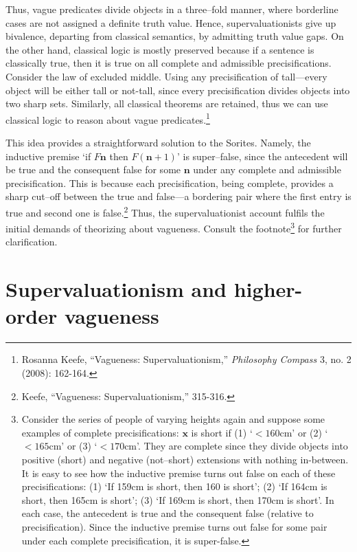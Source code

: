 Thus, vague predicates divide objects in a three--fold manner, where
borderline cases are not assigned a definite truth value. Hence,
supervaluationists give up bivalence, departing from classical
semantics, by admitting truth value gaps. On the other hand, classical
logic is mostly preserved because if a sentence is classically true,
then it is true on all complete and admissible precisifications.
Consider the law of excluded middle. Using any precisification of tall---every object will be either tall or not-tall, since every
precisification divides objects into two sharp sets. Similarly, all
classical theorems are retained, thus we can use classical logic to
reason about vague predicates.\footnote{Rosanna Keefe, ``Vagueness:
  Supervaluationism,'' \emph{Philosophy Compass} 3, no. 2 (2008):
  162-164.}

This idea provides a straightforward solution to the Sorites. Namely,
the inductive premise `if $F\mathbf{n}$ then $F(\mathbf{n}+1)$' is
super--false, since the antecedent will be true and the consequent false
for some $\mathbf{n}$ under any complete and admissible precisification.
This is because each precisification, being complete, provides a sharp
cut--off between the true and false---a bordering pair where the first
entry is true and second one is false.\footnote{Keefe, ``Vagueness:
  Supervaluationism,'' 315-316.} Thus, the supervaluationist account
fulfils the initial demands of theorizing about vagueness. Consult the
footnote\footnote{Consider the series of people of varying heights again
  and suppose some examples of complete precisifications: $\mathbf{x}$ is
  short if (1) `$<160\text{cm}$' or (2) `$<165\text{cm}$' or (3)
  `$<170\text{cm}$'. They are complete since they divide objects into
  positive (short) and negative (not--short) extensions with nothing
  in-between. It is easy to see how the inductive premise turns out
  false on each of these precisifications: (1) `If 159cm is short, then
  160 is short'; (2) `If 164cm is short, then 165cm is short'; (3) `If
  169cm is short, then 170cm is short'. In each case, the antecedent is
  true and the consequent false (relative to precisification). Since the
  inductive premise turns out false for some pair under each complete
  precisification, it is super-false.} for further clarification.

\section{Supervaluationism and higher-order vagueness}

